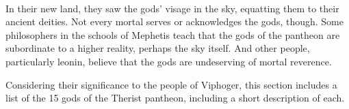 \pagebreak~
\vspace{14.5cm}

In their new land, they saw the gods' visage in the sky, equatting them to their ancient deities.
Not every mortal serves or acknowledges the gods, though.
Some philosophers in the schools of Mephetis teach that the gods of the pantheon are subordinate to a higher reality, perhaps the sky itself.
And other people, particularly leonin, believe that the gods are undeserving of mortal reverence.

Considering their significance to the people of Viphoger, this section includes a list of the 15 gods of the Therist pantheon, including a short description of each.


\newpage






